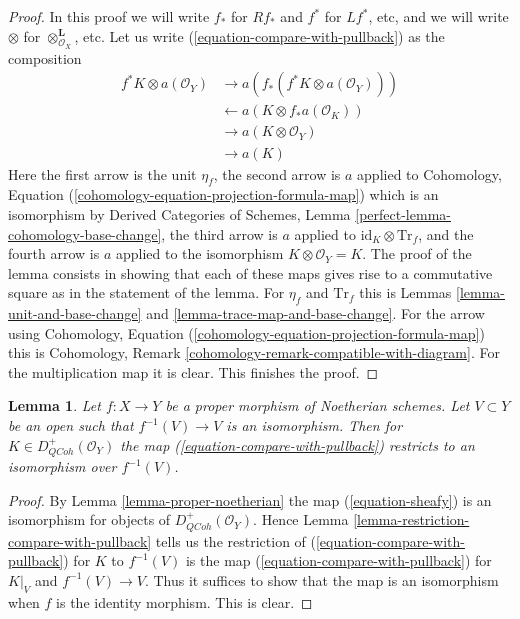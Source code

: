 \documentclass{stacks-project}
\theoremstyle{plain}
\newtheorem{lemma}[subsection]{Lemma}
\theoremstyle{definition}
\theoremstyle{remark}
\numberwithin{equation}{subsection}
\def\QCoh{\mathit{QCoh}}
\begin{document}
\begin{proof}
In this proof we will write $f_*$ for $Rf_*$ and $f^*$ for $Lf^*$, etc,
and we will write $\otimes$ for $\otimes^\mathbf{L}_{\mathcal{O}_X}$, etc.
Let us write (\ref{equation-compare-with-pullback}) as the composition
\begin{align*}
f^*K \otimes a(\mathcal{O}_Y)
& \to
a(f_*(f^*K \otimes a(\mathcal{O}_Y))) \\
& \leftarrow
a(K \otimes f_*a(\mathcal{O}_K)) \\
& \to
a(K \otimes \mathcal{O}_Y) \\
& \to
a(K)
\end{align*}
Here the first arrow is the unit $\eta_f$, the second arrow is $a$
applied to Cohomology, Equation
(\ref{cohomology-equation-projection-formula-map}) which is an
isomorphism by Derived Categories of Schemes, Lemma
\ref{perfect-lemma-cohomology-base-change}, the third arrow is
$a$ applied to $\text{id}_K \otimes \text{Tr}_f$, and the fourth
arrow is $a$ applied to the isomorphism $K \otimes \mathcal{O}_Y = K$.
The proof of the lemma consists in showing that each of these
maps gives rise to a commutative square as in the statement of the lemma.
For $\eta_f$ and $\text{Tr}_f$ this is
Lemmas \ref{lemma-unit-and-base-change} and
\ref{lemma-trace-map-and-base-change}.
For the arrow using Cohomology, Equation
(\ref{cohomology-equation-projection-formula-map})
this is Cohomology, Remark \ref{cohomology-remark-compatible-with-diagram}.
For the multiplication map it is clear. This finishes the proof.
\end{proof}

\begin{lemma}
\label{lemma-compare-on-open}
Let $f : X \to Y$ be a proper morphism of Noetherian schemes. Let $V \subset Y$
be an open such that $f^{-1}(V) \to V$ is an isomorphism. Then for
$K \in D_\QCoh^+(\mathcal{O}_Y)$ the map (\ref{equation-compare-with-pullback})
restricts to an isomorphism over $f^{-1}(V)$.
\end{lemma}

\begin{proof}
By Lemma \ref{lemma-proper-noetherian} the map (\ref{equation-sheafy}) is an
isomorphism for objects of $D_\QCoh^+(\mathcal{O}_Y)$. Hence
Lemma \ref{lemma-restriction-compare-with-pullback} tells us the
restriction of (\ref{equation-compare-with-pullback}) for $K$
to $f^{-1}(V)$ is the map (\ref{equation-compare-with-pullback})
for $K|_V$ and $f^{-1}(V) \to V$. Thus it suffices to show that
the map is an isomorphism when $f$ is the identity morphism. This is clear.
\end{proof}
\end{document}
